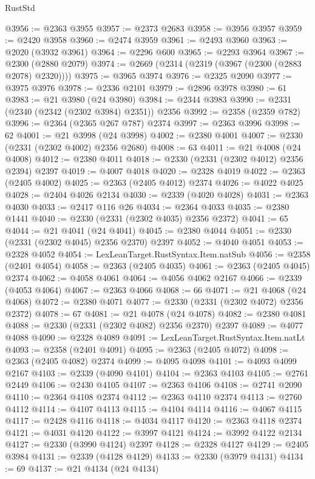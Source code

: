 \begin{lexlean}{RustStd}
\begin{coremodule}
@3956 := @2363 @3955
@3957 := @2373 @2683
@3958 := @3956 @3957
@3959 := @2420 @3958
@3960 := @2474 @3959
@3961 := @2493 @3960
@3963 := @2020 (@3932 @3961)
@3964 := @2296 @600
@3965 := @2293 @3964
@3967 := @2300 (@2880 @2079)
@3974 := @2669 (@2314 (@2319 (@3967 (@2300 (@2883 @2078) @2320))))
@3975 := @3965 @3974
@3976 := @2325 @2090
@3977 := @3975 @3976
@3978 := @2336 @2101
@3979 := @2896 @3978
@3980 := 61
@3983 := @21 @3980 (@24 @3980)
@3984 := @2344 @3983
@3990 := @2331 (@2340 (@2342 (@2302 @3984) @2351)) @2356
@3992 := @2358 (@2359 @782)
@3996 := @2364 (@2365 @267 @787) @2374
@3997 := @2363 @3996
@3998 := 62
@4001 := @21 @3998 (@24 @3998)
@4002 := @2380 @4001
@4007 := @2330 (@2331 (@2302 @4002) @2356 @2680)
@4008 := 63
@4011 := @21 @4008 (@24 @4008)
@4012 := @2380 @4011
@4018 := @2330 (@2331 (@2302 @4012) @2356 @2394) @2397
@4019 := @4007 @4018
@4020 := @2328 @4019
@4022 := @2363 (@2405 @4002)
@4025 := @2363 (@2405 @4012) @2374
@4026 := @4022 @4025
@4028 := @2404 @4026 @2134
@4030 := @2339 (@4020 @4028)
@4031 := @2363 @4030
@4033 := @2417 @116 @26
@4034 := @2364 @4033
@4035 := @2380 @1441
@4040 := @2330 (@2331 (@2302 @4035) @2356 @2372)
@4041 := 65
@4044 := @21 @4041 (@24 @4041)
@4045 := @2380 @4044
@4051 := @2330 (@2331 (@2302 @4045) @2356 @2370) @2397
@4052 := @4040 @4051
@4053 := @2328 @4052
@4054 := LexLeanTarget.RustSyntax.Item.natSub
@4056 := @2358 (@2401 @4054)
@4058 := @2363 (@2405 @4035)
@4061 := @2363 (@2405 @4045) @2374
@4062 := @4058 @4061
@4064 := @4056 @4062 @2167
@4066 := @2339 (@4053 @4064)
@4067 := @2363 @4066
@4068 := 66
@4071 := @21 @4068 (@24 @4068)
@4072 := @2380 @4071
@4077 := @2330 (@2331 (@2302 @4072) @2356 @2372)
@4078 := 67
@4081 := @21 @4078 (@24 @4078)
@4082 := @2380 @4081
@4088 := @2330 (@2331 (@2302 @4082) @2356 @2370) @2397
@4089 := @4077 @4088
@4090 := @2328 @4089
@4091 := LexLeanTarget.RustSyntax.Item.natLt
@4093 := @2358 (@2401 @4091)
@4095 := @2363 (@2405 @4072)
@4098 := @2363 (@2405 @4082) @2374
@4099 := @4095 @4098
@4101 := @4093 @4099 @2167
@4103 := @2339 (@4090 @4101)
@4104 := @2363 @4103
@4105 := @2761 @2449
@4106 := @2430 @4105
@4107 := @2363 @4106
@4108 := @2741 @2090
@4110 := @2364 @4108 @2374
@4112 := @2363 @4110 @2374
@4113 := @2760 @4112
@4114 := @4107 @4113
@4115 := @4104 @4114
@4116 := @4067 @4115
@4117 := @2428 @4116
@4118 := @4034 @4117
@4120 := @2363 @4118 @2374
@4121 := @4031 @4120
@4122 := @3997 @4121
@4124 := @3992 @4122 @2134
@4127 := @2330 (@3990 @4124) @2397
@4128 := @2328 @4127
@4129 := @2405 @3984
@4131 := @2339 (@4128 @4129)
@4133 := @2330 (@3979 @4131)
@4134 := 69
@4137 := @21 @4134 (@24 @4134)

\end{coremodule}
\end{lexlean}
